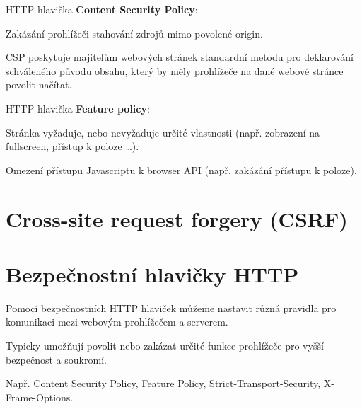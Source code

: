 \begin{compactitem}
\begin{compactitem}
        \item HTTP hlavička \textbf{Content Security Policy}: \begin{compactitem}
            \item Zakázání prohlížeči stahování zdrojů mimo povolené origin.
            \item CSP poskytuje majitelům webových stránek standardní metodu pro deklarování schváleného původu obsahu, který by měly prohlížeče na dané webové stránce povolit načítat.
        \end{compactitem}

        \item HTTP hlavička \textbf{Feature policy}: \begin{compactitem}
            \item Stránka vyžaduje, nebo nevyžaduje určité vlastnosti (např. zobrazení na fullscreen, přístup k poloze \ldots).
            \item Omezení přístupu Javascriptu k browser API (např. zakázání přístupu k poloze).
        \end{compactitem}
    \end{compactitem}
\end{compactitem}


\section{Cross-site request forgery (CSRF)}

\begin{compactitem}
    \item {}
\end{compactitem}


\section{Bezpečnostní hlavičky HTTP}

\begin{compactitem}
    \item Pomocí bezpečnostních HTTP hlaviček můžeme nastavit různá pravidla pro komunikaci mezi webovým prohlížečem a serverem.

    \item Typicky umožňují povolit nebo zakázat určité funkce prohlížeče pro vyšší bezpečnost a soukromí.

    \item Např. Content Security Policy, Feature Policy, Strict-Transport-Security, X-Frame-Options.
\end{compactitem}

